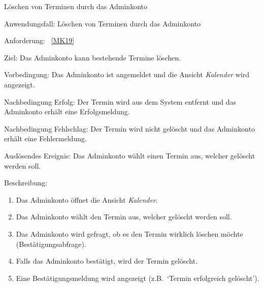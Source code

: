 \pagebreak

\begin{function}{50}{Löschen von Terminen durch das Adminkonto}
    \item[Anwendungsfall:] Löschen von Terminen durch das Adminkonto
    \item[Anforderung:] ~\ref{MK19}
    \item[Ziel:] Das Adminkonto kann bestehende Termine löschen.
    \item[Vorbedingung:] Das Adminkonto ist angemeldet und die Ansicht \textit{Kalender} wird angezeigt.
    \item[Nachbedingung Erfolg:] Der Termin wird aus dem System entfernt und das Adminkonto erhält eine Erfolgsmeldung.
    \item[Nachbedingung Fehlschlag:] Der Termin wird nicht gelöscht und das Adminkonto erhält eine Fehlermeldung.
    \item[Auslösendes Ereignis:] Das Adminkonto wählt einen Termin aus, welcher gelöscht werden soll.
    \item[Beschreibung:] ~
    \begin{enumerate}
        \item Das Adminkonto öffnet die Ansicht \textit{Kalender}.
        \item Das Adminkonto wählt den Termin aus, welcher gelöscht werden soll.
        \item Das Adminkonto wird gefragt, ob es den Termin wirklich löschen möchte (Bestätigungsabfrage).
        \item Falls das Adminkonto bestätigt, wird der Termin gelöscht.
        \item Eine Bestätigungsmeldung wird angezeigt (z.B.\ `Termin erfolgreich gelöscht').
    \end{enumerate}
\end{function}

\pagebreak

